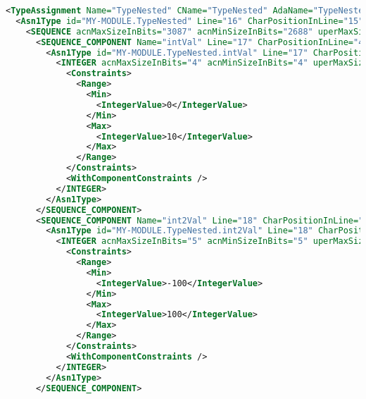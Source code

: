 
\begin{minipage}{15cm}
\begin{lstlisting}[language=XML, caption=Portion of an XML ASN1 grammar., label=asnXML, mathescape=true]
<TypeAssignment Name="TypeNested" CName="TypeNested" AdaName="TypeNested" Line="16" CharPositionInLine="0">
  <Asn1Type id="MY-MODULE.TypeNested" Line="16" CharPositionInLine="15" ParameterizedTypeInstance="false">
    <SEQUENCE acnMaxSizeInBits="3087" acnMinSizeInBits="2688" uperMaxSizeInBits="3087" uperMinSizeInBits="528">
      <SEQUENCE_COMPONENT Name="intVal" Line="17" CharPositionInLine="4" AdaName="intVal" CName="intVal">
        <Asn1Type id="MY-MODULE.TypeNested.intVal" Line="17" CharPositionInLine="11" ParameterizedTypeInstance="false">
          <INTEGER acnMaxSizeInBits="4" acnMinSizeInBits="4" uperMaxSizeInBits="4" uperMinSizeInBits="4">
            <Constraints>
              <Range>
                <Min>
                  <IntegerValue>0</IntegerValue>
                </Min>
                <Max>
                  <IntegerValue>10</IntegerValue>
                </Max>
              </Range>
            </Constraints>
            <WithComponentConstraints />
          </INTEGER>
        </Asn1Type>
      </SEQUENCE_COMPONENT>
      <SEQUENCE_COMPONENT Name="int2Val" Line="18" CharPositionInLine="4" AdaName="int2Val" CName="int2Val">
        <Asn1Type id="MY-MODULE.TypeNested.int2Val" Line="18" CharPositionInLine="12" ParameterizedTypeInstance="false">
          <INTEGER acnMaxSizeInBits="5" acnMinSizeInBits="5" uperMaxSizeInBits="5" uperMinSizeInBits="5">
            <Constraints>
              <Range>
                <Min>
                  <IntegerValue>-100</IntegerValue>
                </Min>
                <Max>
                  <IntegerValue>100</IntegerValue>
                </Max>
              </Range>
            </Constraints>
            <WithComponentConstraints />
          </INTEGER>
        </Asn1Type>
      </SEQUENCE_COMPONENT>
\end{lstlisting}
\end{minipage}

